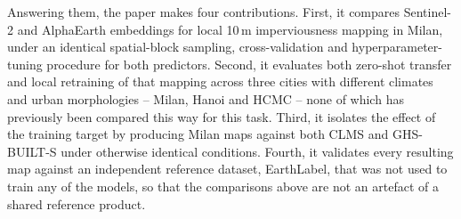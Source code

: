 \documentclass[11pt,a4paper]{article}
\begin{document}
Answering them, the paper makes four contributions. First, it compares
Sentinel-2 and AlphaEarth embeddings for local 10\,m imperviousness mapping
in Milan, under an identical spatial-block sampling, cross-validation and
hyperparameter-tuning procedure for both predictors. Second, it evaluates
both zero-shot transfer and local retraining of that mapping across three
cities with different climates and urban morphologies -- Milan, Hanoi and
HCMC -- none of which has previously been compared this way for this task.
Third, it isolates the effect of the training target by producing Milan maps
against both CLMS and GHS-BUILT-S under otherwise identical conditions.
Fourth, it validates every resulting map against an independent reference
dataset, EarthLabel, that was not used to train any of the models, so that
the comparisons above are not an artefact of a shared reference product.
\end{document}
